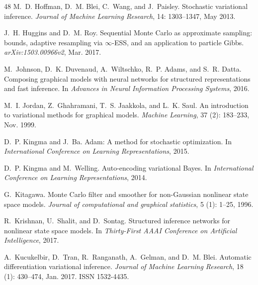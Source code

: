 \begin{thebibliography}{48}
M.~D. Hoffman, D.~M. Blei, C.~Wang, and J.~Paisley.
\newblock Stochastic variational inference.
\newblock \emph{Journal of Machine Learning Research}, 14: 1303--1347,
  May 2013.

J.~H. {Huggins} and D.~M. {Roy}.
\newblock Sequential {M}onte {C}arlo as approximate sampling: bounds, adaptive
  resampling via $\infty$-{ESS}, and an application to particle {G}ibbs.
\newblock \emph{arXiv:1503.00966v2}, Mar. 2017.

M.~Johnson, D.~K. Duvenaud, A.~Wiltschko, R.~P. Adams, and S.~R. Datta.
\newblock Composing graphical models with neural networks for structured
  representations and fast inference.
\newblock In \emph{Advances in Neural Information Processing Systems}, 2016.

M.~I. Jordan, Z.~Ghahramani, T.~S. Jaakkola, and L.~K. Saul.
\newblock An introduction to variational methods for graphical models.
\newblock \emph{Machine Learning}, 37 (2): 183--233, Nov.
  1999.

D.~P. Kingma and J.~Ba.
\newblock Adam: A method for stochastic optimization.
\newblock In \emph{International Conference on Learning Representations}, 2015.

D.~P. Kingma and M.~Welling.
\newblock Auto-encoding variational {B}ayes.
\newblock In \emph{International Conference on Learning Representations}, 2014.

G.~Kitagawa.
\newblock Monte {C}arlo filter and smoother for non-{G}aussian nonlinear state
  space models.
\newblock \emph{Journal of computational and graphical statistics}, 5
  (1): 1--25, 1996.

R.~Krishnan, U.~Shalit, and D.~Sontag.
\newblock Structured inference networks for nonlinear state space models.
\newblock In \emph{Thirty-First AAAI Conference on Artificial Intelligence},
  2017.

A.~Kucukelbir, D.~Tran, R.~Ranganath, A.~Gelman, and D.~M. Blei.
\newblock Automatic differentiation variational inference.
\newblock \emph{Journal of Machine Learning Research}, 18
  (1): 430--474, Jan. 2017.
\newblock ISSN 1532-4435.


\end{thebibliography}
